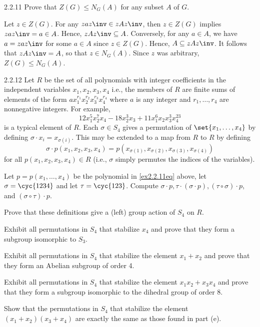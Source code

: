 \begin{exercise}{2.2.11}
    Prove that $Z(G)\le N_G(A)$ for any subset $A$ of $G$.
\end{exercise}

\begin{sol}
    Let $z \in Z(G)$.
	For any $zaz\inv \in zAz\inv$, then $z \in Z(G)$ implies $zaz\inv = a \in A$.
	Hence, $zAz\inv \subseteq A$.
	Conversely, for any $a \in A$, we have $a = zaz\inv$ for some $a \in A$ since $z \in Z(G)$.
	Hence, $A \subseteq zAz\inv$.
	It follows that $zAz\inv = A$, so that $z \in N_G(A)$.
	Since $z$ was arbitrary, $Z(G) \leq N_G(A)$.
\end{sol}

\begin{exercise}{2.2.12}
    Let $R$ be the set of all polynomials with integer coefficients in the independent variables $x_1, x_2, x_3, x_4$ i.e., the members of $R$ are finite sums of elements of the form $ax_1^{r_1}x_2^{r_2}x_3^{r_3}x_4^{r_4}$ where $a$ is any integer and $r_1, \ldots, r_4$ are nonnegative integers.
	For example,
    \begin{equation}
        \label{ex2.2.11eq}
        \tag{$*$}
        12x_1^5x_2^7x_4 - 18x_2^3x_3 + 11x_1^6x_2x_3^3x_4^{23}
    \end{equation}
    is a typical element of $R$.
	Each $\sigma \in S_4$ gives a permutation of $\set{x_1, \ldots, x_4}$ by defining $\sigma \cdot x_i = x_{\sigma(i)}$.
	This may be extended to a map from $R$ to $R$ by defining
    \[
    	\sigma \cdot p(x_1, x_2, x_3, x_4) = p(x_{\sigma(1)}, x_{\sigma(2)}, x_{\sigma(3)}, x_{\sigma(4)})
    \]
    for all $p(x_1, x_2, x_3, x_4) \in R$ (i.e., $\sigma$ simply permutes the indices of the variables).
    \begin{subexercises}
        \item Let $p = p(x_1, \ldots, x_4)$ be the polynomial in \eqref{ex2.2.11eq} above, let $\sigma = \cyc{1 2 3 4}$ and let $\tau = \cyc{1 2 3}$.
	    Compute $\sigma \cdot p, \tau \cdot (\sigma \cdot p), (\tau \circ \sigma) \cdot p$, and $(\sigma \circ \tau) \cdot p$.
        \item Prove that these definitions give a (left) group action of $S_4$ on $R$.
        \item Exhibit all permutations in $S_4$ that stabilize $x_4$ and prove that they form a subgroup isomorphic to $S_3$.
        \item Exhibit all permutations in $S_4$ that stabilize the element $x_1 + x_2$ and prove that they form an Abelian subgroup of order 4.
        \item Exhibit all permutations in $S_4$ that stabilize the element $x_1x_2 + x_3x_4$ and prove that they form a subgroup isomorphic to the dihedral group of order 8.
        \item Show that the permutations in $S_4$ that stabilize the element $(x_1 + x_2)(x_3 + x_4)$ are exactly the same as those found in part (e).
    \end{subexercises}
\end{exercise}

